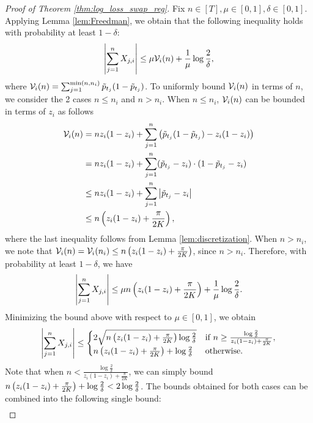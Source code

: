 \begin{proof}[Proof of Theorem \ref{thm:log_loss_swap_reg}]
    Fix $n \in [T], \mu \in [0, 1], \delta \in [0, 1]$. Applying Lemma \ref{lem:Freedman}, we obtain that the following inequality holds with probability at least $1 - \delta$:  \begin{align*}
        \left\lvert\sum_{j = 1} ^ {n} X_{j, i}\right\rvert \le \mu \mathcal{V}_{i}(n) + \frac{1}{\mu} \log \frac{2}{\delta},
    \end{align*}
    where $\mathcal{V}_{i}(n) = \sum_{j = 1} ^ {\min(n, n_{i})} \tilde{p}_{t_{j}} (1 - \tilde{p}_{t_{j}})$. To uniformly bound $\mathcal{V}_{i}(n)$ in terms of $n$, we consider the 2 cases $n \le n_{i}$ and $n > n_{i}$.
    When $n \le n_{i}$,  $\mathcal{V}_{i}(n)$ can be bounded in terms of $z_{i}$ as follows \begin{align*}
        \mathcal{V}_{i}(n) &= n z_{i}(1 - z_{i}) + \sum_{j = 1} ^ {n} \left( \tilde{p}_{t_{j}} (1 - \tilde{p}_{t_{j}}) - z_{i}(1 - z_{i}) \right) \\
        &= n z_{i}(1 - z_{i}) + \sum_{j = 1} ^ {n} (\tilde{p}_{t_{j}} - z_{i}) \cdot (1 - \tilde{p}_{t_{j}} - z_{i}) \\
        &\le nz_{i}(1 - z_{i}) + \sum_{j = 1} ^ {n} \left\lvert\tilde{p}_{t_{j}} - z_{i}\right\rvert \\
        &\le n \left( z_{i}(1 - z_{i}) + \frac{\pi}{2K} \right),
    \end{align*}
    where the last inequality follows from Lemma \ref{lem:discretization}. When $n > n_{i}$, we note that $\mathcal{V}_{i}(n) = \mathcal{V}_{i}(n_{i}) \le n\left( z_{i}(1 - z_{i}) + \frac{\pi}{2K} \right)$, since $n > n_{i}$. Therefore, with probability at least $1 - \delta$, we have \begin{align*}
        \left\lvert\sum_{j = 1} ^ {n} X_{j, i}\right\rvert  \le \mu n\left( z_{i}(1 - z_{i}) + \frac{\pi}{2K} \right) + \frac{1}{\mu} \log \frac{2}{\delta}.
    \end{align*}
    Minimizing the bound above with respect to $\mu \in [0, 1]$, we obtain \begin{align*}
        \left\lvert\sum_{j = 1} ^ {n} X_{j, i}\right\rvert \le \begin{cases}
            2\sqrt{n \left( z_{i}(1 - z_{i}) + \frac{\pi}{2K} \right) \log \frac{2}{\delta}} & \text{if } n \ge \frac{\log \frac{2}{\delta}}{z_{i}(1 - z_{i}) + \frac{\pi}{2K}}, \\
            n\left( z_{i}(1 - z_{i}) + \frac{\pi}{2K} \right) + \log \frac{2}{\delta} & \text{otherwise}.
        \end{cases}
    \end{align*}
    Note that when $n < \frac{\log \frac{2}{\delta}}{z_{i}(1 - z_{i}) + \frac{\pi}{2K}}$, we can simply bound $n\left( z_{i}(1 - z_{i}) + \frac{\pi}{2K} \right) + \log \frac{2}{\delta} < 2 \log \frac{2}{\delta}$. The bounds obtained for both cases can be combined into the following single bound: \begin{align*}

\end{align*}
\end{proof}
